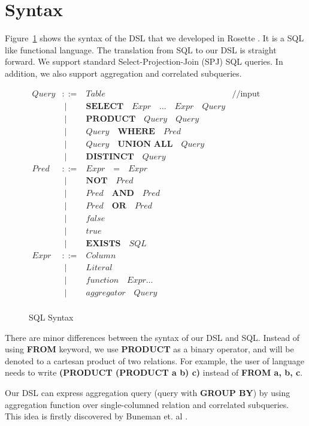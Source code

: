 \section{Syntax}

Figure~\ref{tab:sql-syntax} shows the syntax of the DSL that we developed
in Rosette \cite{rosette}. It is a SQL like functional language. The 
translation from SQL to our DSL is straight forward. We support standard
Select-Projection-Join (SPJ) SQL queries. In addition, we also support 
aggregation and correlated subqueries. 

\begin{figure}[t]
\centering
\[
\begin{array}{llll}
  Query & ::=  &  Table & \text{//input table} \\
        & \; \mid & \textbf{SELECT} \quad Expr \quad \ldots \quad Expr \quad  Query      \\ 
        & \; \mid  & \textbf{PRODUCT} \quad Query \quad Query        \\
        & \; \mid & Query \quad \textbf{WHERE} \quad Pred        \\
        & \; \mid & Query \quad \textbf{UNION ALL} \quad Query   \\
        & \; \mid & \textbf{DISTINCT} \quad Query                \\
  Pred & ::= & Expr \quad \textbf{=} \quad Expr \\
       & \; \mid &  \textbf{NOT} \quad Pred      \\
       & \; \mid & Pred \quad \textbf{AND} \quad Pred      \\ 
       & \; \mid & Pred \quad \textbf{OR} \quad Pred \\
       & \; \mid & false \\
       & \; \mid & true  \\
       & \; \mid & \textbf{EXISTS} \quad SQL \\
  Expr & ::= & Column                     \\
        & \; \mid & Literal                  \\
        & \; \mid & function \quad Expr \ldots     \\
        & \; \mid & aggregator \quad Query   \\  
\end{array}
\]
\caption{SQL Syntax}
\label{tab:sql-syntax}
\end{figure}

There are minor differences between the syntax of our DSL and SQL. Instead of using \textbf{FROM} keyword, we use \textbf{PRODUCT} as 
a binary operator, and will be denoted to a cartesan product of 
two relations. For example, the user of language needs to write 
\textbf{(PRODUCT (PRODUCT a b) c)} instead of \textbf{FROM a, b, c}.  

Our DSL can express aggregation query (query with \textbf{GROUP BY}) by
using aggregation function over single-columned relation and correlated subqueries. This idea is firstly discovered by Buneman et. al \cite{comp_syntax}.

